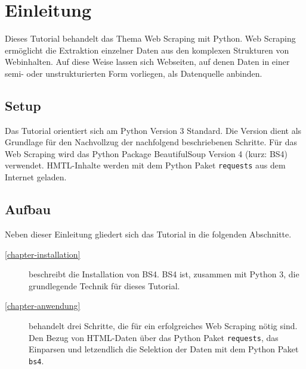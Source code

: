 
\chapter{Einleitung}

Dieses Tutorial behandelt das Thema Web Scraping mit Python.
Web Scraping ermöglicht die Extraktion einzelner Daten aus den komplexen Strukturen von Webinhalten.
Auf diese Weise lassen sich Webseiten, auf denen Daten in einer semi- oder unstrukturierten Form vorliegen, als Datenquelle anbinden.

\section{Setup}

Das Tutorial orientiert sich am Python Version 3 Standard. 
Die Version dient als Grundlage für den Nachvollzug der nachfolgend beschriebenen Schritte.
Für das Web Scraping wird das Python Package BeautifulSoup Version 4 (kurz: BS4) verwendet.
HMTL-Inhalte werden mit dem Python Paket \texttt{requests} aus dem Internet geladen.

\section{Aufbau}

Neben dieser Einleitung gliedert sich das Tutorial in die folgenden Abschnitte.
\begin{description}
  \item[\ref{chapter-installation}] beschreibt die Installation von BS4. 
  BS4 ist, zusammen mit Python 3, die grundlegende Technik für dieses Tutorial.
  \item[\ref{chapter-anwendung}] behandelt drei Schritte, die für ein erfolgreiches Web Scraping nötig sind. Den Bezug von HTML-Daten über das Python Paket \texttt{requests}, das Einparsen und letzendlich die Selektion der Daten mit dem Python Paket \texttt{bs4}.
\end{description}
